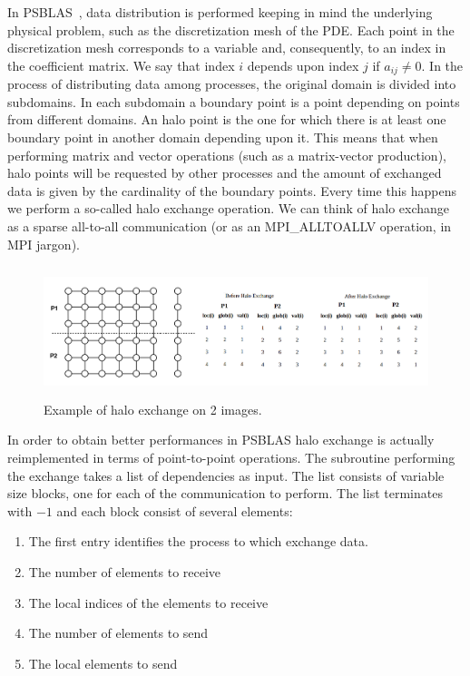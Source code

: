 \documentclass{IOS-Book-Article}
\begin{document}
In PSBLAS~\cite{PSBLAS}, data distribution is performed keeping in mind the underlying physical problem, such as the discretization mesh of the PDE. 
Each point in the discretization mesh corresponds to a variable and, consequently, to an index in the coefficient matrix. We say that index $i$ depends upon index $j$ if $a_{ij}\neq0$. 
In the process of distributing data among processes, the original domain is divided into subdomains. 
In each subdomain a boundary point is a point depending on points from different domains. An halo point is the one for which there is at least one boundary point in another domain depending upon it. 
This means that when performing matrix and vector operations (such as a matrix-vector production), halo points will be requested by other processes and the amount of exchanged data is given by the cardinality of the boundary points. 
Every time this happens we perform a so-called halo exchange operation. We can think of halo exchange as a sparse all-to-all communication (or as an MPI\_ALLTOALLV operation, in MPI jargon).
\begin{figure}
\includegraphics[height=1.5in, width=4.65in]{halo2.png}
\caption{Example of halo exchange on 2 images. }
\end{figure}
In order to obtain better performances in PSBLAS halo exchange is actually reimplemented in terms of point-to-point operations. 
The subroutine performing the exchange takes a list of dependencies as input. The list consists of variable size blocks, one for each of the communication to perform. The list terminates with $-1$ and each block consist of several elements:
\begin{enumerate}
\item The first entry identifies the process to which exchange data.
\item The number of elements to receive
\item The local indices of the elements to receive
\item The number of elements to send
\item The local elements to send
\end{enumerate}
\end{document}
